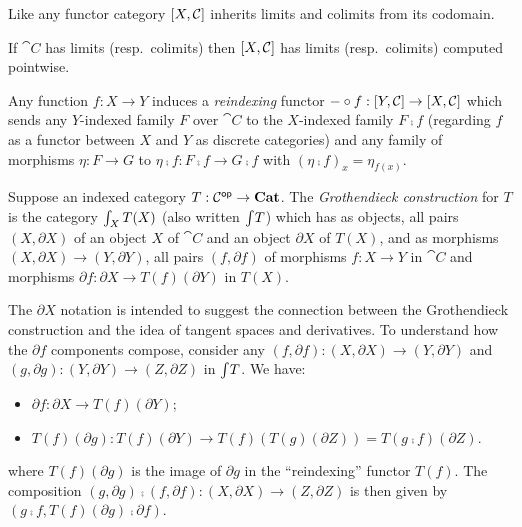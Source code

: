 Like any functor category $[X,\mathcal{C}]$ inherits limits and colimits from its codomain.

\begin{proposition}
If $\cat{C}$ has limits (resp.~colimits) then $[X,\mathcal{C}]$ has limits (resp.~colimits) computed
pointwise.
\end{proposition}

Any function $f: X \to Y$ induces a \emph{reindexing} functor $- \circ f: [Y,\mathcal{C}] \to
[X,\mathcal{C}]$ which sends any $Y$-indexed family $F$ over $\cat{C}$ to the $X$-indexed family $F \comp f$
(regarding $f$ as a functor between $X$ and $Y$ as discrete categories) and any family of morphisms $\eta: F
\to G$ to $\eta \comp f: F \comp f \to G \comp f$ with $(\eta \comp f)_x = \eta_{f(x)}$.

\begin{definition}
\label{def:grothendieck:Grothendieck}
Suppose an indexed category $T: \mathcal{C}^{\mathsf{op}} \to \mathbf{Cat}$. The \emph{Grothendieck construction} for $T$ is the
category $\int_{X}T(X)$ (also written $\int_{}T$) which has as objects, all pairs $(X,
\partial X)$ of an object $X$ of $\cat{C}$ and an object $\partial X$ of $T(X)$, and as morphisms $(X,
\partial X) \to (Y, \partial Y)$, all pairs $(f, \partial f)$ of morphisms $f: X \to Y$ in $\cat{C}$ and
morphisms $\partial f: \partial X \to T(f)(\partial Y)$ in $T(X)$.
\end{definition}

\noindent The $\partial X$ notation is intended to suggest the connection between the Grothendieck
construction and the idea of tangent spaces and derivatives. To understand how the $\partial f$ components
compose, consider any $(f, \partial f): (X, \partial X) \to (Y, \partial Y)$ and $(g, \partial g): (Y,
\partial Y) \to (Z, \partial Z)$ in $\int_{}T$. We have:

\begin{itemize}
\item $\partial f: \partial X \to T(f)(\partial Y)$;
\item $T(f)(\partial g): T(f)(\partial Y) \to T(f)(T(g)(\partial Z)) = T(g \comp f)(\partial Z)$.
\end{itemize}

\noindent where $T(f)(\partial g)$ is the image of $\partial g$ in the ``reindexing'' functor $T(f)$. The
composition $(g, \partial g) \comp (f, \partial f): (X, \partial X) \to (Z, \partial Z)$ is then given by $(g
\comp f, T(f)(\partial g) \comp \partial f)$.

